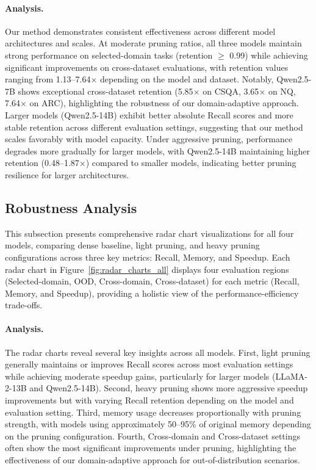 \paragraph{Analysis.}
Our method demonstrates consistent effectiveness across different model architectures and scales.
At moderate pruning ratios, all three models maintain strong performance on selected-domain tasks (retention $\geq$ 0.99) while achieving significant improvements on cross-dataset evaluations, with retention values ranging from 1.13--7.64$\times$ depending on the model and dataset.
Notably, Qwen2.5-7B shows exceptional cross-dataset retention (5.85$\times$ on CSQA, 3.65$\times$ on NQ, 7.64$\times$ on ARC), highlighting the robustness of our domain-adaptive approach.
Larger models (Qwen2.5-14B) exhibit better absolute Recall scores and more stable retention across different evaluation settings, suggesting that our method scales favorably with model capacity.
Under aggressive pruning, performance degrades more gradually for larger models, with Qwen2.5-14B maintaining higher retention (0.48--1.87$\times$) compared to smaller models, indicating better pruning resilience for larger architectures.

\subsection{Robustness Analysis}
\label{app:radar_charts}

This subsection presents comprehensive radar chart visualizations for all four models, comparing dense baseline, light pruning, and heavy pruning configurations across three key metrics: Recall, Memory, and Speedup.
Each radar chart  in Figure~\ref{fig:radar_charts_all} displays four evaluation regions (Selected-domain, OOD, Cross-domain, Cross-dataset) for each metric (Recall, Memory, and Speedup), providing a holistic view of the performance-efficiency trade-offs. 

\paragraph{Analysis.}
The radar charts reveal several key insights across all models.
First, light pruning generally maintains or improves Recall scores across most evaluation settings while achieving moderate speedup gains, particularly for larger models (LLaMA-2-13B and Qwen2.5-14B).
Second, heavy pruning shows more aggressive speedup improvements but with varying Recall retention depending on the model and evaluation setting.
Third, memory usage decreases proportionally with pruning strength, with models using approximately 50--95\% of original memory depending on the pruning configuration.
Fourth, Cross-domain and Cross-dataset settings often show the most significant improvements under pruning, highlighting the effectiveness of our domain-adaptive approach for out-of-distribution scenarios.


